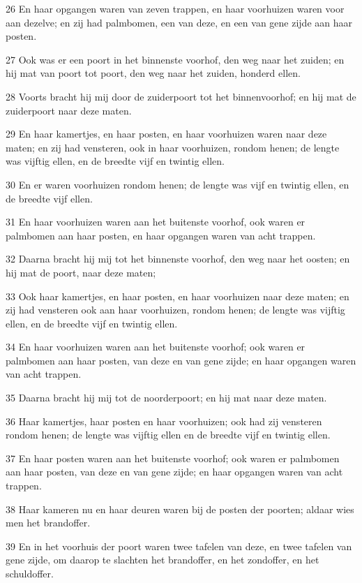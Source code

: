 \par 26 En haar opgangen waren van zeven trappen, en haar voorhuizen waren voor aan dezelve; en zij had palmbomen, een van deze, en een van gene zijde aan haar posten.
\par 27 Ook was er een poort in het binnenste voorhof, den weg naar het zuiden; en hij mat van poort tot poort, den weg naar het zuiden, honderd ellen.
\par 28 Voorts bracht hij mij door de zuiderpoort tot het binnenvoorhof; en hij mat de zuiderpoort naar deze maten.
\par 29 En haar kamertjes, en haar posten, en haar voorhuizen waren naar deze maten; en zij had vensteren, ook in haar voorhuizen, rondom henen; de lengte was vijftig ellen, en de breedte vijf en twintig ellen.
\par 30 En er waren voorhuizen rondom henen; de lengte was vijf en twintig ellen, en de breedte vijf ellen.
\par 31 En haar voorhuizen waren aan het buitenste voorhof, ook waren er palmbomen aan haar posten, en haar opgangen waren van acht trappen.
\par 32 Daarna bracht hij mij tot het binnenste voorhof, den weg naar het oosten; en hij mat de poort, naar deze maten;
\par 33 Ook haar kamertjes, en haar posten, en haar voorhuizen naar deze maten; en zij had vensteren ook aan haar voorhuizen, rondom henen; de lengte was vijftig ellen, en de breedte vijf en twintig ellen.
\par 34 En haar voorhuizen waren aan het buitenste voorhof; ook waren er palmbomen aan haar posten, van deze en van gene zijde; en haar opgangen waren van acht trappen.
\par 35 Daarna bracht hij mij tot de noorderpoort; en hij mat naar deze maten.
\par 36 Haar kamertjes, haar posten en haar voorhuizen; ook had zij vensteren rondom henen; de lengte was vijftig ellen en de breedte vijf en twintig ellen.
\par 37 En haar posten waren aan het buitenste voorhof; ook waren er palmbomen aan haar posten, van deze en van gene zijde; en haar opgangen waren van acht trappen.
\par 38 Haar kameren nu en haar deuren waren bij de posten der poorten; aldaar wies men het brandoffer.
\par 39 En in het voorhuis der poort waren twee tafelen van deze, en twee tafelen van gene zijde, om daarop te slachten het brandoffer, en het zondoffer, en het schuldoffer.
